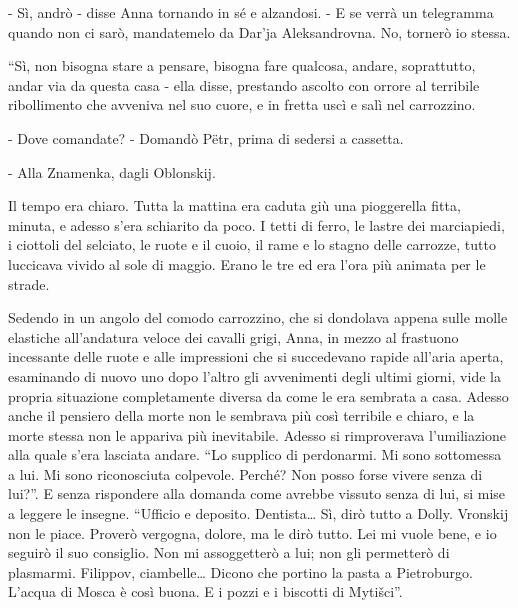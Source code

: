 - Sì, andrò - disse Anna tornando in sé e alzandosi. - E se verrà un telegramma quando non ci sarò, mandatemelo da Dar'ja Aleksandrovna. No, tornerò io stessa. 

``Sì, non bisogna stare a pensare, bisogna fare qualcosa, andare, soprattutto, andar via da questa casa - ella disse, prestando ascolto con orrore al terribile ribollimento che avveniva nel suo cuore, e in fretta uscì e salì nel carrozzino. 

- Dove comandate? - Domandò Pëtr, prima di sedersi a cassetta. 

- Alla Znamenka, dagli Oblonskij. 

Il tempo era chiaro. Tutta la mattina era caduta giù una pioggerella fitta, minuta, e adesso s'era schiarito da poco. I tetti di ferro, le lastre dei marciapiedi, i ciottoli del selciato, le ruote e il cuoio, il rame e lo stagno delle carrozze, tutto luccicava vivido al sole di maggio. Erano le tre ed era l'ora più animata per le strade. 

Sedendo in un angolo del comodo carrozzino, che si dondolava appena sulle molle elastiche all'andatura veloce dei cavalli grigi, Anna, in mezzo al frastuono incessante delle ruote e alle impressioni che si succedevano rapide all'aria aperta, esaminando di nuovo uno dopo l'altro gli avvenimenti degli ultimi giorni, vide la propria situazione completamente diversa da come le era sembrata a casa. Adesso anche il pensiero della morte non le sembrava più così terribile e chiaro, e la morte stessa non le appariva più inevitabile. Adesso si rimproverava l'umiliazione alla quale s'era lasciata andare. ``Lo supplico di perdonarmi. Mi sono sottomessa a lui. Mi sono riconosciuta colpevole. Perché? Non posso forse vivere senza di lui?''. E senza rispondere alla domanda come avrebbe vissuto senza di lui, si mise a leggere le insegne. ``Ufficio e deposito. Dentista\ldots{} Sì, dirò tutto a Dolly. Vronskij non le piace. Proverò vergogna, dolore, ma le dirò tutto. Lei mi vuole bene, e io seguirò il suo consiglio. Non mi assoggetterò a lui; non gli permetterò di plasmarmi. Filippov, ciambelle\ldots{} Dicono che portino la pasta a Pietroburgo. L'acqua di Mosca è così buona. E i pozzi e i biscotti di Mytišci''. 

